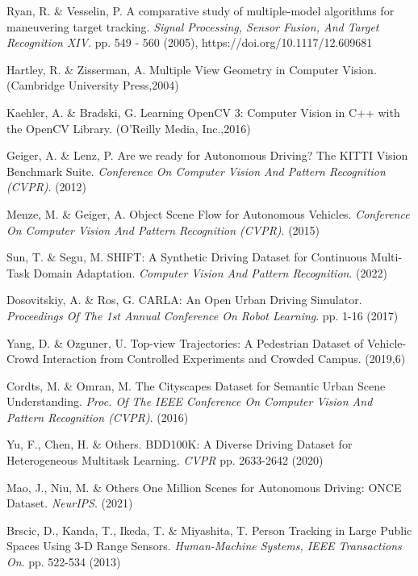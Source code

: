 \begin{thebibliography}{00}
Ryan, R. \& Vesselin, P. A comparative study of multiple-model algorithms for maneuvering target tracking. {\em Signal Processing, Sensor Fusion, And Target Recognition XIV}. pp. 549 - 560 (2005), https://doi.org/10.1117/12.609681


Hartley, R. \& Zisserman, A. Multiple View Geometry in Computer Vision. (Cambridge University Press,2004)


Kaehler, A. \& Bradski, G. Learning OpenCV 3: Computer Vision in C++ with the OpenCV Library. (O'Reilly Media, Inc.,2016)


Geiger, A. \& Lenz, P. Are we ready for Autonomous Driving? The KITTI Vision Benchmark Suite. {\em Conference On Computer Vision And Pattern Recognition (CVPR)}. (2012)


Menze, M. \& Geiger, A. Object Scene Flow for Autonomous Vehicles. {\em Conference On Computer Vision And Pattern Recognition (CVPR)}. (2015)


Sun, T. \& Segu, M. SHIFT: A Synthetic Driving Dataset for Continuous Multi-Task Domain Adaptation. {\em Computer Vision And Pattern Recognition}. (2022)


Dosovitskiy, A. \& Ros, G.  CARLA: An Open Urban Driving Simulator. {\em Proceedings Of The 1st Annual Conference On Robot Learning}. pp. 1-16 (2017)


Yang, D. \& Ozguner, U. Top-view Trajectories: A Pedestrian Dataset of Vehicle-Crowd Interaction from Controlled Experiments and Crowded Campus.  (2019,6)


Cordts, M. \& Omran, M. The Cityscapes Dataset for Semantic Urban Scene Understanding. {\em Proc. Of The IEEE Conference On Computer Vision And Pattern Recognition (CVPR)}. (2016)


Yu, F., Chen, H. \& Others. BDD100K: A Diverse Driving Dataset for Heterogeneous Multitask Learning. {\em CVPR} pp. 2633-2642 (2020)


Mao, J., Niu, M. \& Others One Million Scenes for Autonomous Driving: ONCE Dataset. {\em NeurIPS}. (2021)


Brscic, D., Kanda, T., Ikeda, T. \& Miyashita, T. Person Tracking in Large Public Spaces Using 3-D Range Sensors. {\em Human-Machine Systems, IEEE Transactions On}. pp. 522-534 (2013)

\end{thebibliography}

